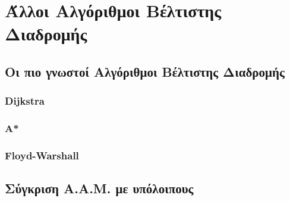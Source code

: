 \section{Άλλοι Αλγόριθμοι Βέλτιστης Διαδρομής} 

\subsection{Οι πιο γνωστοί Αλγόριθμοι Βέλτιστης Διαδρομής}
\subsubsection{Dijkstra}
\subsubsection{A*}
\subsubsection{Floyd-Warshall}


\subsection{Σύγκριση Α.Α.Μ. με υπόλοιπους}
